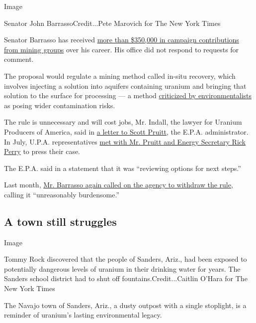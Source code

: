 Image

Senator John BarrassoCredit...Pete Marovich for The New York Times

Senator Barrasso has received
\href{https://www.opensecrets.org/members-of-congress/industries?cid=N00006236\&cycle=CAREER\&type=I}{more
than \$350,000 in campaign contributions from mining groups} over his
career. His office did not respond to requests for comment.

The proposal would regulate a mining method called in-situ recovery,
which involves injecting a solution into aquifers containing uranium and
bringing that solution to the surface for processing --- a method
\href{https://www.nrdc.org/sites/default/files/uranium-mining-report.pdf}{criticized
by environmentalists} as posing wider contamination risks.

The rule is unnecessary and will cost jobs, Mr. Indall, the lawyer for
Uranium Producers of America, said in
\href{http://theupa.org/_resources/news/UPA-Comments-EPA-Regulatory-Review-May-15-2017.pdf}{a
letter to Scott Pruitt}, the E.P.A. administrator. In July, U.P.A.
representatives
\href{http://www.theupa.org/_resources/news/UPA-July-25-2017-Press-Release.pdf}{met
with Mr. Pruitt and Energy Secretary Rick Perry} to press their case.

The E.P.A. said in a statement that it was ``reviewing options for next
steps.''

Last month,
\href{https://www.epw.senate.gov/public/_cache/files/7/b/7b0204a4-681d-4f61-ace0-c76a791467ba/70422F424D1DF2650D3BFD02D7571E04.12.14.17-barrasso-pruitt-letter-isr.pdf}{Mr.
Barrasso again called on the agency to withdraw the rule}, calling it
``unreasonably burdensome.''

\hypertarget{a-town-still-struggles}{%
\subsection{A town still struggles}\label{a-town-still-struggles}}

Image

Tommy Rock discovered that the people of Sanders, Ariz., had been
exposed to potentially dangerous levels of uranium in their drinking
water for years. The Sanders school district had to shut off
fountains.Credit...Caitlin O'Hara for The New York Times

The Navajo town of Sanders, Ariz., a dusty outpost with a single
stoplight, is a reminder of uranium's lasting environmental legacy.

